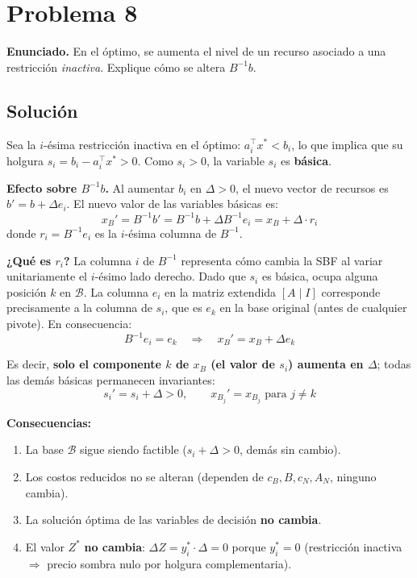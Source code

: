\documentclass{article}
\begin{document}
\newpage
\section*{Problema 8}

\textbf{Enunciado.} En el óptimo, se aumenta el nivel de un recurso asociado a una restricción \emph{inactiva}. Explique cómo se altera $B^{-1}b$.

\subsection*{Solución}

Sea la $i$-ésima restricción inactiva en el óptimo: $a_i^\top x^* < b_i$, lo que implica que su holgura $s_i=b_i-a_i^\top x^*>0$. Como $s_i>0$, la variable $s_i$ es \textbf{básica}.

\textbf{Efecto sobre $B^{-1}b$.} Al aumentar $b_i$ en $\Delta>0$, el nuevo vector de recursos es $b'=b+\Delta e_i$. El nuevo valor de las variables básicas es:
$$x_B'=B^{-1}b'=B^{-1}b+\Delta B^{-1}e_i=x_B+\Delta\cdot r_i$$
donde $r_i=B^{-1}e_i$ es la $i$-ésima columna de $B^{-1}$.

\textbf{¿Qué es $r_i$?} La columna $i$ de $B^{-1}$ representa cómo cambia la SBF al variar unitariamente el $i$-ésimo lado derecho. Dado que $s_i$ es básica, ocupa alguna posición $k$ en $\mathcal{B}$. La columna $e_i$ en la matriz extendida $[A\mid I]$ corresponde precisamente a la columna de $s_i$, que es $e_k$ en la base original (antes de cualquier pivote). En consecuencia:
$$B^{-1}e_i = e_k \quad\Longrightarrow\quad x_B' = x_B + \Delta e_k$$

Es decir, \textbf{solo el componente $k$ de $x_B$ (el valor de $s_i$) aumenta en $\Delta$}; todas las demás básicas permanecen invariantes:
$$s_i' = s_i+\Delta>0,\qquad x_{B_j}'=x_{B_j}\text{ para }j\neq k$$

\textbf{Consecuencias:}
\begin{enumerate}[1.]
  \item La base $\mathcal{B}$ sigue siendo factible ($s_i+\Delta>0$, demás sin cambio).
  \item Los costos reducidos no se alteran (dependen de $c_B,B,c_N,A_N$, ninguno cambia).
  \item La solución óptima de las variables de decisión \textbf{no cambia}.
  \item El valor $Z^*$ \textbf{no cambia}: $\Delta Z=y_i^*\cdot\Delta=0$ porque $y_i^*=0$ (restricción inactiva $\Rightarrow$ precio sombra nulo por holgura complementaria).
\end{enumerate}
\end{document}
